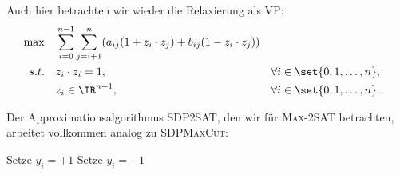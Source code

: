\documentclass[language=ngerman,algolist]{TemplateLecture}
\begin{document}
Auch hier betrachten wir wieder die Relaxierung als VP:
\begin{equation}
    \begin{aligned}
        \max \quad & \sum_{i = 0}^{n-1} \sum_{j = i + 1}^n (a_{ij} (1 + z_i \cdot z_j) + b_{ij} (1 - z_i \cdot z_j)) \\
        s.t. \quad & z_i \cdot z_i = 1, && \forall i \in \set{0,1,\ldots,n}, \\
        & z_i \in \IR^{n+1}, && \forall i \in \set{0,1,\ldots,n}.
    \end{aligned}\label{eq:max2SATVP}
\end{equation}

Der Approximationsalgorithmus \textsc{SDP2SAT}, den wir für \textsc{Max-2SAT} betrachten, arbeitet vollkommen analog zu \textsc{SDPMaxCut}:
\begin{algorithm}[h]
    \caption{\textsc{SDP2SAT}}\label{alg:SDP2SAT}
    \begin{algorithmic}[1]
             Setze $y_i = +1$
            \Else{} Setze $y_i = -1$
            \EndIf{}
        \EndFor{}
    \end{algorithmic}
\end{algorithm}
\end{document}
